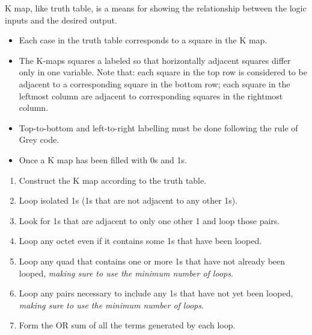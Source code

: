         \par K map, like truth table, is a means for showing the relationship between
        the logic inputs and the desired output.
        \begin{itemize}
            \item Each case in the truth table corresponds to a square in the K map.
            \item The K-maps squares a labeled so that horizontally adjacent squares differ
                only in one variable. Note that: each square in the top row is considered to be
                adjacent to a corresponding square in the bottom row; each square in the leftmost
                column are adjacent to corresponding squares in the rightmost column.
            \item Top-to-bottom and left-to-right labelling must be done following the rule of
                Grey code.
            \item Once a K map has been filled with 0s and 1s.
        \end{itemize}
        \begin{enumerate}
            \item Construct the K map according to the truth table.
            \item Loop isolated 1s (1s that are not adjacent to any other 1s).
            \item Look for 1s that are adjacent to only one other 1 and loop
            those pairs.
            \item Loop any octet even if it contains some 1s that have been looped.
            \item Loop any quad that contains one or more 1s that have not already been looped,
                \textit{making sure to use the minimum number of loops}.
            \item Loop any pairs necessary to include any 1s that have not yet been looped,
                \textit{making sure to use the minimum number of loops}.
            \item Form the OR sum of all the terms generated by each loop.
        \end{enumerate}


